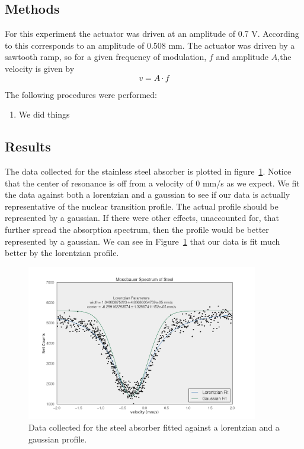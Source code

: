 \documentclass[paper=a4, fontsize=11pt, abstract=on]{scrartcl} %
\numberwithin{equation}{section}
\numberwithin{figure}{section}
\numberwithin{table}{section}
\begin{document}
\subsection{Methods}
\label{sec:stmeth}

For this experiment the actuator was driven at an amplitude of 0.7
V. According to \cite{writeup} this corresponds to an amplitude of
0.508 mm. The actuator was driven by a sawtooth ramp, so for a given
frequency of modulation, $f$ and amplitude $A$,the velocity is given by
\begin{equation}
  \label{eq:vel}
  v = A\cdot f
\end{equation}

\vline

The following procedures were performed:
\begin{enumerate}
\item We did things
\end{enumerate}

\subsection{Results}
\label{sec:stres}

The data collected for the stainless steel absorber is plotted in
figure~\ref{fig:steel}. Notice that the center of resonance is off
from a velocity of 0 mm/s as we expect. We fit the data against both a lorentzian and
a gaussian to see if our data is actually representative of the
nuclear transition profile. The actual profile should be
represented by a gaussian. If there were other effects, unaccounted
for, that further spread the absorption spectrum, then the profile
would be better represented by a gaussian. We can see in
Figure~\ref{fig:steel} that our data is fit much better by the
lorentzian profile. 

\begin{figure}[h]
  \centering
  \includegraphics[width=0.9\textwidth]{steelfit}
  \caption{Data collected for the steel absorber fitted against a lorentzian and a gaussian profile.}
  \label{fig:steel}
\end{figure}
\end{document}
